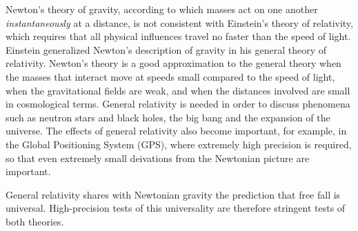 Newton's theory of gravity, according to which masses act on one another
\emph{instantaneously} at a distance, is not consistent with Einstein's theory of
relativity, which requires that all physical influences travel no faster than the
speed of light. Einstein generalized Newton's description of gravity in his
general theory of relativity. Newton's theory is a good approximation to the
general theory when the masses that interact move at speeds small compared to the
speed of light, when the gravitational fields are weak, and when the distances
involved are small in cosmological terms. General relativity is needed in order
to discuss phenomena such as neutron stars and black holes, the big bang and the
expansion of the universe. The effects of general relativity also become important,
for example, in the Global Positioning System (GPS), where extremely high precision
is required, so that even extremely small deivations from the Newtonian picture are
important.

General relativity shares with Newtonian gravity the prediction that free fall
is universal. High-precision tests of this universality are therefore stringent
tests of both theories.
